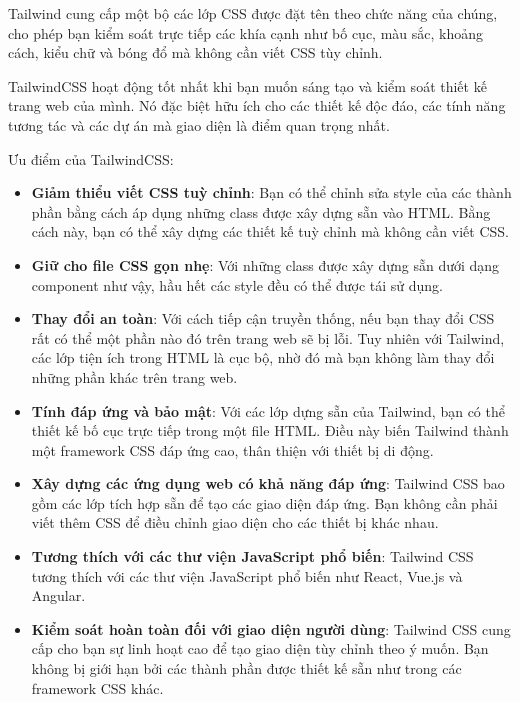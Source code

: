 Tailwind cung cấp một bộ các lớp CSS được đặt tên theo chức năng của chúng, cho phép bạn kiểm soát trực tiếp các khía cạnh như bố cục, màu sắc, khoảng cách, kiểu chữ và bóng đổ mà không cần viết CSS tùy chỉnh. 

TailwindCSS hoạt động tốt nhất khi bạn muốn sáng tạo và kiểm soát thiết kế trang web của mình. Nó đặc biệt hữu ích cho các thiết kế độc đáo, các tính năng tương tác và các dự án mà giao diện là điểm quan trọng nhất. 

Ưu điểm của TailwindCSS:
\begin{itemize}
    \item \textbf{Giảm thiểu viết CSS tuỳ chỉnh}: Bạn có thể chỉnh sửa style của các thành phần bằng cách áp dụng những class được xây dựng sẵn vào HTML. Bằng cách này, bạn có thể xây dựng các thiết kế tuỳ chỉnh mà không cần viết CSS.
    \item \textbf{Giữ cho file CSS gọn nhẹ}: Với những class được xây dựng sẵn dưới dạng component như vậy, hầu hết các style đều có thể được tái sử dụng.
    \item \textbf{Thay đổi an toàn}: Với cách tiếp cận truyền thống, nếu bạn thay đổi CSS rất có thể một phần nào đó trên trang web sẽ bị lỗi. Tuy nhiên với Tailwind, các lớp tiện ích trong HTML là cục bộ, nhờ đó mà bạn không làm thay đổi những phần khác trên trang web. 
    \item \textbf{Tính đáp ứng và bảo mật}: Với các lớp dựng sẵn của Tailwind, bạn có thể thiết kế bố cục trực tiếp trong một file HTML. Điều này biến Tailwind thành một framework CSS đáp ứng cao, thân thiện với thiết bị di động. 
    \item \textbf{Xây dựng các ứng dụng web có khả năng đáp ứng}: Tailwind CSS bao gồm các lớp tích hợp sẵn để tạo các giao diện đáp ứng. Bạn không cần phải viết thêm CSS để điều chỉnh giao diện cho các thiết bị khác nhau. 
    \item \textbf{Tương thích với các thư viện JavaScript phổ biến}: Tailwind CSS tương thích với các thư viện JavaScript phổ biến như React, Vue.js và Angular.
    \item \textbf{Kiểm soát hoàn toàn đối với giao diện người dùng}: Tailwind CSS cung cấp cho bạn sự linh hoạt cao để tạo giao diện tùy chỉnh theo ý muốn. Bạn không bị giới hạn bởi các thành phần được thiết kế sẵn như trong các framework CSS khác. 
\end{itemize}

